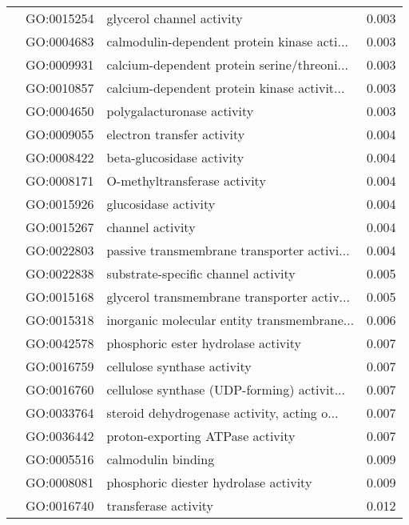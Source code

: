 \begin{longtable}{lllr}
   & GO:0015254 &                    glycerol channel activity &         0.003 \\
   & GO:0004683 &  calmodulin-dependent protein kinase acti... &         0.003 \\
   & GO:0009931 &  calcium-dependent protein serine/threoni... &         0.003 \\
   & GO:0010857 &  calcium-dependent protein kinase activit... &         0.003 \\
   & GO:0004650 &                   polygalacturonase activity &         0.003 \\
   & GO:0009055 &                   electron transfer activity &         0.004 \\
   & GO:0008422 &                    beta-glucosidase activity &         0.004 \\
   & GO:0008171 &                 O-methyltransferase activity &         0.004 \\
   & GO:0015926 &                         glucosidase activity &         0.004 \\
   & GO:0015267 &                             channel activity &         0.004 \\
   & GO:0022803 &  passive transmembrane transporter activi... &         0.004 \\
   & GO:0022838 &          substrate-specific channel activity &         0.005 \\
   & GO:0015168 &  glycerol transmembrane transporter activ... &         0.005 \\
   & GO:0015318 &  inorganic molecular entity transmembrane... &         0.006 \\
   & GO:0042578 &          phosphoric ester hydrolase activity &         0.007 \\
   & GO:0016759 &                  cellulose synthase activity &         0.007 \\
   & GO:0016760 &  cellulose synthase (UDP-forming) activit... &         0.007 \\
   & GO:0033764 &  steroid dehydrogenase activity, acting o... &         0.007 \\
   & GO:0036442 &             proton-exporting ATPase activity &         0.007 \\
   & GO:0005516 &                           calmodulin binding &         0.009 \\
   & GO:0008081 &        phosphoric diester hydrolase activity &         0.009 \\
   & GO:0016740 &                         transferase activity &         0.012 \\

\end{longtable}
